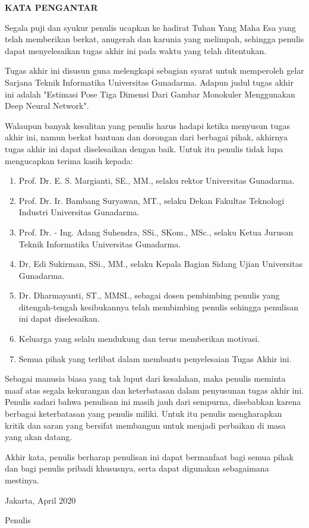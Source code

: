 \newpage %
\begin{center}
  \begin{large}\textbf{KATA PENGANTAR}\\\end{large}
\end{center}
\vspace{5mm}


Segala puji dan syukur penulis ucapkan ke hadirat Tuhan Yang Maha Esa yang telah memberikan berkat,
anugerah dan karunia yang melimpah, sehingga penulis dapat menyelesaikan tugas akhir ini pada waktu
yang telah ditentukan.

Tugas akhir ini disusun guna melengkapi sebagian syarat untuk memperoleh gelar Sarjana Teknik
Informatika Universitas Gunadarma. Adapun judul tugas akhir ini adalah "Estimasi Pose Tiga Dimensi
Dari Gambar Monokuler Menggunakan Deep Neural Network".

Walaupun banyak kesulitan yang penulis harus hadapi ketika menyusun tugas akhir ini, namun berkat
bantuan dan dorongan dari berbagai pihak, akhirnya tugas akhir ini dapat diselesaikan dengan baik.
Untuk itu penulis tidak lupa mengucapkan terima kasih kepada:

\begin{enumerate}
  \item Prof. Dr. E. S. Margianti, SE., MM., selaku rektor Universitas Gunadarma.
  \item Prof. Dr. Ir. Bambang Suryawan, MT., selaku Dekan Fakultas Teknologi Industri Universitas Gunadarma.
  \item Prof. Dr. - Ing. Adang Suhendra, SSi., SKom., MSc., selaku Ketua Jurusan Teknik Informatika Universitas Gunadarma.
  \item Dr, Edi Sukirman, SSi., MM., selaku Kepala Bagian Sidang Ujian Universitas Gunadarma.
  \item Dr. Dharmayanti, ST., MMSI., sebagai dosen pembimbing penulis yang ditengah-tengah kesibukannya
        telah membimbing penulis sehingga penulisan ini dapat diselesaikan.
  \item Keluarga yang selalu mendukung dan terus memberikan motivasi.
  \item Semua pihak yang terlibat dalam membantu penyelesaian Tugas Akhir ini.

\end{enumerate}

Sebagai manusia biasa yang tak luput dari kesalahan, maka penulis meminta maaf atas segala
kekurangan dan keterbatasan dalam penyusunan tugas akhir ini. Penulis sadari bahwa penulisan ini
masih jauh dari sempurna, disebabkan karena berbagai keterbatasan yang penulis miliki. Untuk itu
penulis mengharapkan kritik dan saran yang bersifat membangun untuk menjadi perbaikan di masa yang
akan datang.

Akhir kata, penulis berharap penulisan ini dapat bermanfaat bagi semua pihak dan bagi penulis
pribadi khususnya, serta dapat digunakan sebagaimana mestinya.


\vspace{0.5 cm}
\begin{flushright}
  Jakarta, April 2020

  \vspace{2 cm}
  Penulis
\end{flushright}
